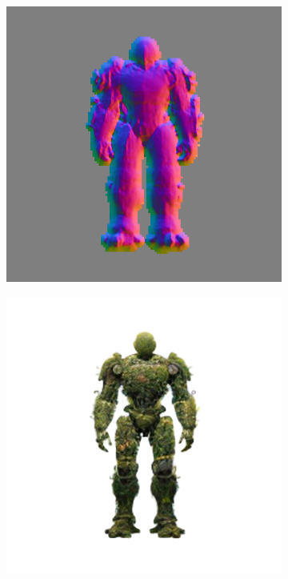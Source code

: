 \begin{figure}[ht]
\begin{subfigure}[b]{0.18\textwidth}
        \includegraphics[width=\textwidth]{etc/a robot made out of plants/wonder3d/test/wonder3D_6000_front_part4}
        \caption{}
    \end{subfigure}
    \begin{subfigure}[b]{0.18\textwidth}
        \centering
        \fontsize{9pt}{7pt}\selectfont{}
        \includegraphics[width=\textwidth]{etc/a robot made out of plants/wonder3d/test/wonder3D_9000_front_part1}

\end{subfigure}
\end{figure}
